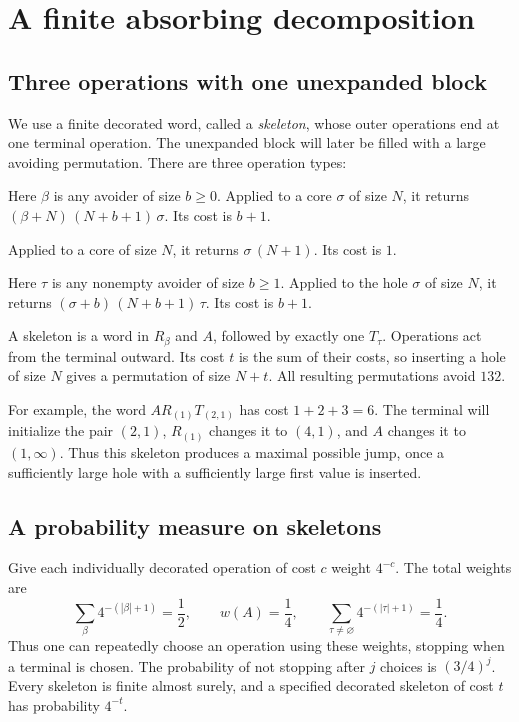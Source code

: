 \documentclass[11pt,a4paper]{article}
\theoremstyle{definition}\newaliascnt{definition}{theorem}
\theoremstyle{remark}\newaliascnt{remark}{theorem}
\begin{document}
\section{A finite absorbing decomposition}
\label{lj:sec:skeleton}

\subsection{Three operations with one unexpanded block}
We use a finite decorated word, called a \emph{skeleton}, whose outer
operations end at one terminal operation. The unexpanded block will later
be filled with a large avoiding permutation. There are three operation
types:
\begin{description}[style=nextline,leftmargin=0pt,labelwidth=0pt,labelsep=0pt]
\item[$R_\beta$: a large right block.]
Here $\beta$ is any avoider of size $b\ge0$. Applied to a core $\sigma$
of size $N$, it returns
$(\beta+N)\,(N+b+1)\,\sigma$. Its cost is $b+1$.
\item[$A$: append a maximum.]
Applied to a core of size $N$, it returns $\sigma\,(N+1)$.
Its cost is $1$.
\item[$T_\tau$: a terminal finite right block.]
Here $\tau$ is any nonempty avoider of size $b\ge1$. Applied to the hole
$\sigma$ of size $N$, it returns
$(\sigma+b)\,(N+b+1)\,\tau$. Its cost is $b+1$.
\end{description}
A skeleton is a word in $R_\beta$ and $A$, followed by exactly one
$T_\tau$. Operations act from the terminal outward. Its cost $t$ is the
sum of their costs, so inserting a hole of size $N$ gives a permutation
of size $N+t$. All resulting permutations avoid $132$.

For example, the word $A R_{(1)}T_{(2,1)}$ has cost $1+2+3=6$.
The terminal will initialize the pair $(2,1)$, $R_{(1)}$ changes it to
$(4,1)$, and $A$ changes it to $(1,\infty)$. Thus this skeleton produces
a maximal possible jump, once a sufficiently large hole with a sufficiently
large first value is inserted.

\subsection{A probability measure on skeletons}
Give each individually decorated operation of cost $c$ weight $4^{-c}$.
The total weights are
\begin{equation}
 \sum_\beta4^{-(|\beta|+1)}=\frac12,
 \qquad w(A)=\frac14,
 \qquad\sum_{\tau\ne\varnothing}4^{-(|\tau|+1)}=\frac14.
 \label{lj:eq:operation-masses}
\end{equation}
Thus one can repeatedly choose an operation using these weights, stopping
when a terminal is chosen. The probability of not stopping after $j$
choices is $(3/4)^j$. Every skeleton is finite almost surely, and a
specified decorated skeleton of cost $t$ has probability $4^{-t}$.
\end{document}
